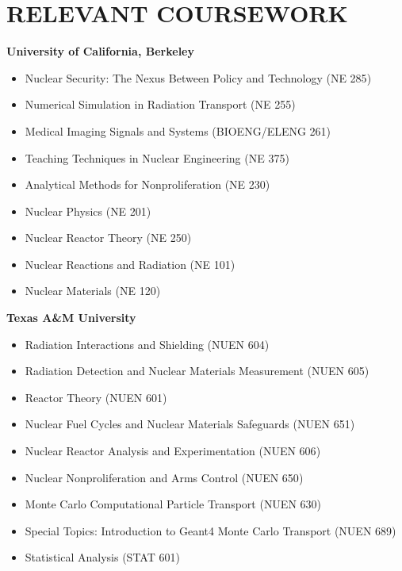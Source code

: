 \section{\small{RELEVANT COURSEWORK}}

\textbf{University of California, Berkeley}\\[-2.3ex]
\begin{itemize}[leftmargin=4ex] \itemsep -2pt
    \item Nuclear Security: The Nexus Between Policy and Technology ({\footnotesize{NE 285}})
    \item Numerical Simulation in Radiation Transport ({\footnotesize{NE 255}})
    \item Medical Imaging  Signals and Systems ({\footnotesize{BIOENG/ELENG 261}})
    \item Teaching Techniques in Nuclear Engineering ({\footnotesize{NE 375}})
    \item Analytical Methods for Nonproliferation ({\footnotesize{NE 230}})
    \item Nuclear Physics ({\footnotesize{NE 201}})
    \item Nuclear Reactor Theory ({\footnotesize{NE 250}})
    \item Nuclear Reactions and Radiation ({\footnotesize{NE 101}})
    \item Nuclear Materials ({\footnotesize{NE 120}})
\end{itemize}

\textbf{Texas A\&M University}\\[-2.3ex]
\begin{itemize}[leftmargin=4ex] \itemsep -2pt
    \item Radiation Interactions and Shielding ({\footnotesize{NUEN 604}})
    \item Radiation Detection and Nuclear Materials Measurement ({\footnotesize{NUEN 605}})
    \item Reactor Theory ({\footnotesize{NUEN 601}})
    \item Nuclear Fuel Cycles and Nuclear Materials Safeguards ({\footnotesize{NUEN 651}})
    \item Nuclear Reactor Analysis and Experimentation ({\footnotesize{NUEN 606}})
    \item Nuclear Nonproliferation and Arms Control ({\footnotesize{NUEN 650}})
    \item Monte Carlo Computational Particle Transport ({\footnotesize{NUEN 630}})
    \item Special Topics: Introduction to Geant4 Monte Carlo Transport ({\footnotesize{NUEN 689}})
    \item Statistical Analysis ({\footnotesize{STAT 601}})
\end{itemize}

